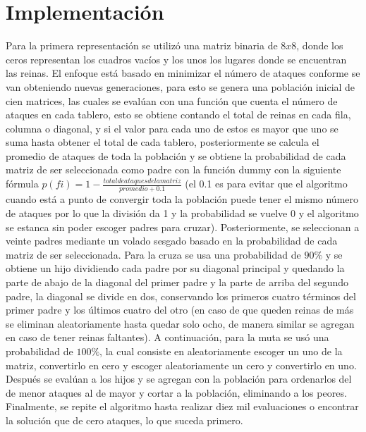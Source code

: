 \documentclass[runningheads]{llncs}
\begin{document}
\section{Implementación}
Para la primera representación se utilizó una matriz binaria de $8x8$, donde los ceros representan los cuadros vacíos y los unos los lugares donde se encuentran las reinas. El enfoque está basado en minimizar el número de ataques conforme se van obteniendo nuevas generaciones, para esto se genera una población inicial de cien matrices, las cuales se evalúan con una función que cuenta el número de ataques en cada tablero, esto se obtiene contando el total de reinas en cada fila, columna o diagonal, y si el valor para cada uno de estos es mayor que uno se suma hasta obtener el total de cada tablero, posteriormente se calcula el promedio de ataques de toda la población y se obtiene la probabilidad de cada matriz de ser seleccionada como padre con la función dummy con la siguiente fórmula $p(fi)=1- \frac{total de ataques de la matriz}{promedio+0.1}$ (el 0.1 es para evitar que el algoritmo cuando está a punto de convergir toda la población puede tener el mismo número de ataques por lo que la división da 1 y la probabilidad se vuelve 0 y el algoritmo se estanca sin poder escoger padres para cruzar). Posteriormente, se seleccionan a veinte padres mediante un volado sesgado basado en la probabilidad de cada matriz de ser seleccionada. Para la cruza se usa una probabilidad de $90\%$ y se obtiene un hijo dividiendo cada padre por su diagonal principal y quedando la parte de abajo de la diagonal del primer padre y la parte de arriba del segundo padre, la diagonal se divide en dos, conservando los primeros cuatro términos del primer padre y los últimos cuatro del otro (en caso de que queden reinas de más se eliminan aleatoriamente hasta quedar solo ocho, de manera similar se agregan en caso de tener reinas faltantes). A continuación, para la muta se usó una probabilidad de $100\%$, la cual consiste en aleatoriamente escoger un uno de la matriz, convertirlo en cero y escoger aleatoriamente un cero y convertirlo en uno. Después se evalúan a los hijos y se agregan con la población para ordenarlos del de menor ataques al de mayor y cortar a la población, eliminando a los peores. Finalmente, se repite el algoritmo hasta realizar diez mil evaluaciones o encontrar la solución que de cero ataques, lo que suceda primero.\\
\end{document}
